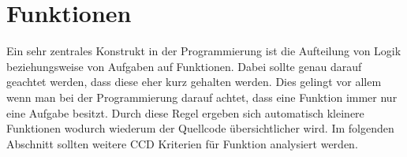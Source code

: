 \section{Funktionen}

\SuperPar Ein sehr zentrales Konstrukt in der Programmierung ist die Aufteilung von Logik beziehungsweise von Aufgaben
auf Funktionen. Dabei sollte genau darauf geachtet werden, dass diese eher kurz gehalten werden. Dies gelingt 
vor allem wenn man bei der Programmierung darauf achtet, dass eine Funktion immer nur eine Aufgabe besitzt. 
Durch diese Regel ergeben sich automatisch kleinere Funktionen wodurch wiederum der Quellcode übersichtlicher wird.
Im folgenden Abschnitt sollten weitere CCD Kriterien für Funktion analysiert werden.

